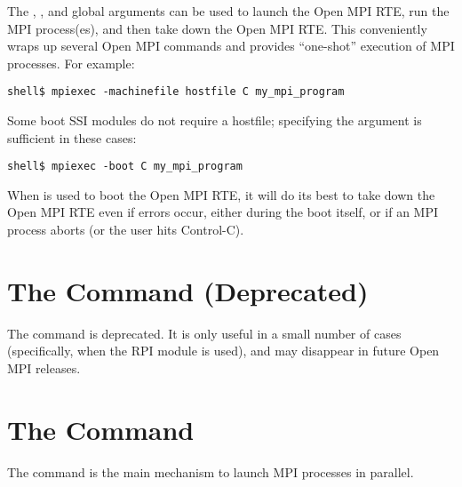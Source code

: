 The , , and  global
arguments can be used to launch the Open MPI RTE, run the MPI process(es),
and then take down the Open MPI RTE.  This conveniently wraps up several
Open MPI commands and provides ``one-shot'' execution of MPI processes.
For example:

\lstset{style=lam-cmdline}
\begin{lstlisting}
shell$ mpiexec -machinefile hostfile C my_mpi_program
\end{lstlisting}

Some boot SSI modules do not require a hostfile; specifying the
 argument is sufficient in these cases:

\lstset{style=lam-cmdline}
\begin{lstlisting}
shell$ mpiexec -boot C my_mpi_program
\end{lstlisting}

When  is used to boot the Open MPI RTE, it will do its best to
take down the Open MPI RTE even if errors occur, either during the boot
itself, or if an MPI process aborts (or the user hits Control-C).


\section{The  Command (Deprecated)}
\label{sec:commands-mpimsg}

The  command is deprecated.  It is only useful in a small
number of cases (specifically, when the  RPI module is
used), and may disappear in future Open MPI releases.


\section{The  Command}
\label{sec:commands-mpirun}

The  command is the main mechanism to launch MPI processes
in parallel.  


